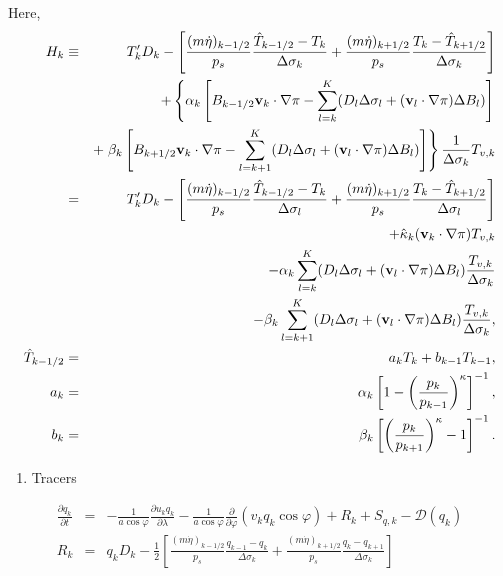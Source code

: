 Here,
\begin{eqnarray}
   H_k
     &\equiv &  T_k' D_k
              - \left[   \frac{(m\dot{\eta})_{k-1/2}}{p_s} \frac{\hat{T}_{k-1/2} - T_k}{\Delta\sigma_k}
               + \frac{(m\dot{\eta})_{k+1/2}}{p_s} \frac{T_k - \hat{T}_{k+1/2}}{\Delta\sigma_k} \right] \notag\\
        &&+ \left\{ \alpha_k
                    \left[ B_{k-1/2} {\mathbf{v}}_k \cdot \nabla \pi
                          - \sum_{l=k}^{K}
                           (D_l \Delta \sigma_l + ({\mathbf{v}}_l \cdot \nabla \pi)\Delta B_l)
                    \right]
             \right. \notag\\
          &&+ \left. \beta_k
                     \left[ B_{k+1/2} {\mathbf{v}}_k \cdot \nabla \pi
                          - \sum_{l=k+1}^{K}
                           (D_l \Delta \sigma_l + ({\mathbf{v}}_l \cdot \nabla \pi)\Delta B_l)
                    \right]
              \right\}
              \frac{1}{\Delta \sigma_k} T_{v,k}\notag\\
     &= & T_k' D_k
          - \left[ \frac{(m\dot{\eta})_{k-1/2}}{p_s} \frac{\hat{T}_{k-1/2} - T_k}{\Delta \sigma_l}
               + \frac{(m\dot{\eta})_{k+1/2}}{p_s} \frac{T_k - \hat{T}_{k+1/2}}{\Delta \sigma_l} \right] \notag\\
        &&+ \hat{\kappa}_k ({\mathbf{v}}_k \cdot \nabla \pi) T_{v,k} \notag\\
        &&- \alpha_k \sum_{l=k}^{K}
                           (D_l \Delta \sigma_l + ({\mathbf{v}}_l \cdot \nabla \pi)\Delta B_l)
                            \frac{T_{v,k}}{\Delta \sigma_k} \notag\\
        &&- \beta_k \sum_{l=k+1}^{K}
                           (D_l \Delta \sigma_l + ({\mathbf{v}}_l \cdot \nabla \pi)\Delta B_l)
                            \frac{T_{v,k}}{\Delta \sigma_k}, \\
  \hat{T}_{k-1/2}
   &=& a_k T_k + b_{k-1} T_{k-1}, \\
  a_k  &=&  \alpha_k
              \left[ 1- \left( \frac{ p_k }{ p_{k-1} }
                        \right)^{\kappa} \right]^{-1},  \\
  b_k  &=&  \beta_k
              \left[ \left( \frac{ p_k }{ p_{k+1} }
                     \right)^{\kappa} - 1 \right]^{-1} .
\end{eqnarray}

\begin{enumerate}
\def\labelenumi{\arabic{enumi}.}
\setcounter{enumi}{4}
\tightlist
\item
  Tracers
\end{enumerate}
\begin{eqnarray}
  \frac{\partial q_k}{\partial t}
      &=&   - \frac{1}{a\cos\varphi}
               \frac{\partial u_k q_k}{\partial \lambda}
          - \frac{1}{a\cos\varphi}
               \frac{\partial }{\partial \varphi} ( v_k q_k\cos\varphi)
          + R_k
          + S_{q,k}
          - {\mathcal D}(q_k) \\
R_k  &=&  q_k D_k
       - \frac{1}{2}
             \left[   \frac{(m\dot{\eta})_{k-1/2}}{p_s} \frac{q_{k-1} - q_k}{\Delta\sigma_k}
               + \frac{(m\dot{\eta})_{k+1/2}}{p_s} \frac{q_k   - q_{k+1}}{\Delta\sigma_k} \right]
\end{eqnarray}

